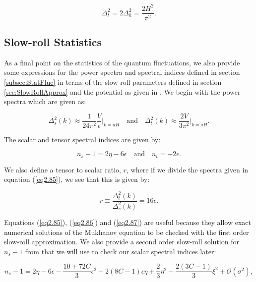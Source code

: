 \documentclass[a4paper,12pt,twoside]{report}
\begin{document}
\begin{equation} \label{eq2.84}
\Delta^{2}_{t} = 2\Delta^{2}_{h} = \frac{2H^{2}}{\pi^{2}}.
\end{equation}

\subsection{Slow-roll Statistics} \label{subsec:SlowRollStat}

As a final point on the statistics of the quantum fluctuations, we also provide some expressions for the power spectra and spectral indices defined in section \ref{subsec:StatFluc} in terms of the slow-roll parameters defined in section \ref{sec:SlowRollApprox} and the potential as given in \cite{liddle2000cosmological}. We begin with the power spectra which are given as:

\begin{equation} \label{eq2.85}
\Delta^{2}_{s}(k) \approx \frac{1}{24\pi^{2}} \frac{V}{\epsilon} \biggr\rvert_{k = aH} \quad \mathrm{and} \quad \Delta^{2}_{t}(k) \approx \frac{2V}{3\pi^{2}} \biggr\rvert_{k = aH}.
\end{equation}

The scalar and tensor spectral indices are given by:

\begin{equation} \label{eq2.86}
n_{s} - 1 = 2\eta - 6\epsilon \quad \mathrm{and} \quad n_{t} = -2\epsilon.
\end{equation}

We also define a tensor to scalar ratio, $r$, where if we divide the spectra given in equation (\ref{eq2.85}), we see that this is given by:

\begin{equation} \label{eq2.87}
r \equiv \frac{\Delta^{2}_{t}(k)}{\Delta^{2}_{s}(k)} = 16 \epsilon.
\end{equation}

Equations (\ref{eq2.85}), (\ref{eq2.86}) and (\ref{eq2.87}) are useful because they allow exact numerical solutions of the Mukhanov equation to be checked with the first order slow-roll approximation. We also provide a second order slow-roll solution for $n_{s} - 1$ from \cite{liddle2000cosmological} that we will use to check our scalar spectral indices later:

\begin{equation} \label{eq2.88}
n_{s} - 1 = 2\eta - 6\epsilon - \frac{10 + 72C}{3} \epsilon^{2} + 2(8C-1)\epsilon \eta +\frac{2}{3} \eta^{2} - \frac{2(3C - 1)}{3} \xi^{2} + \mathcal{O}(\sigma^{2}),
\end{equation}
\end{document}

